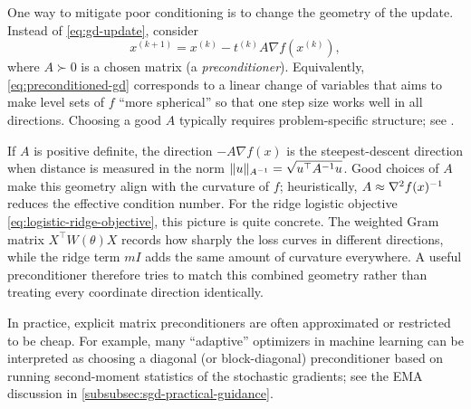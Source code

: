 One way to mitigate poor conditioning is to change the geometry of the update.
Instead of \eqref{eq:gd-update}, consider
\begin{equation}
  x^{(k+1)} = x^{(k)} - t^{(k)} A \nabla f(x^{(k)}),
  \label{eq:preconditioned-gd}
\end{equation}
where $A \succ 0$ is a chosen matrix (a \emph{preconditioner}).
Equivalently, \eqref{eq:preconditioned-gd} corresponds to a linear change of variables that aims to make level sets of $f$ ``more spherical'' so that one step size works well in all directions.
Choosing a good $A$ typically requires problem-specific structure; see \citet[\S9.4]{boyd_vandenberghe_2004_convex}.

If $A$ is positive definite, the direction $-A\nabla f(x)$ is the steepest-descent direction when distance is measured in the norm $\lVert u\rVert_{A^{-1}}=\sqrt{u^\top A^{-1}u}$.
Good choices of $A$ make this geometry align with the curvature of $f$; heuristically, $A \approx \nabla^2 f(x)^{-1}$ reduces the effective condition number.
For the ridge logistic objective \eqref{eq:logistic-ridge-objective}, this picture is quite concrete.
The weighted Gram matrix $X^\top W(\theta)X$ records how sharply the loss curves in different directions, while the ridge term $mI$ adds the same amount of curvature everywhere.
A useful preconditioner therefore tries to match this combined geometry rather than treating every coordinate direction identically.

In practice, explicit matrix preconditioners are often approximated or restricted to be cheap.
For example, many ``adaptive'' optimizers in machine learning can be interpreted as choosing a diagonal (or block-diagonal) preconditioner based on running second-moment statistics of the stochastic gradients; see the EMA discussion in \cref{subsubsec:sgd-practical-guidance}.


